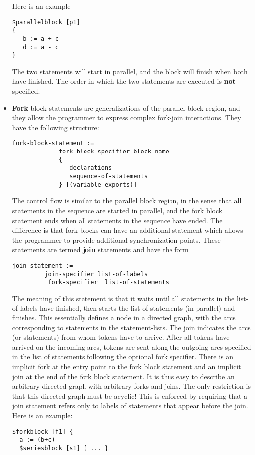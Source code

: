 \documentclass{article}
\begin{document}
\begin{itemize}
Here is an example
\begin{verbatim}
$parallelblock [p1] 
{
   b := a + c
   d := a - c
}
\end{verbatim} %
The two statements will start in parallel, and the block 
will finish when both have finished.  The
order in which the two statements are executed
is {\bf not} specified.
\item {\bf Fork} block statements are generalizations of the
parallel block region, and they allow the programmer to express 
complex fork-join interactions.
They have the following structure:
\begin{verbatim}
fork-block-statement :=
             fork-block-specifier block-name
             {
                declarations
                sequence-of-statements
             } [(variable-exports)]
\end{verbatim}
The control flow is similar to the parallel block region,
in the sense that all statements in the sequence are started
in parallel, and the fork block statement ends when all statements
in the sequence have ended.  The difference is that
fork blocks can have an additional statement which
allows the programmer to provide additional synchronization
points.  These statements are termed {\bf join} statements
and have the form
\begin{verbatim}
join-statement :=
         join-specifier list-of-labels 
          fork-specifier  list-of-statements
\end{verbatim}
The meaning of this statement is that it waits until all statements
in the list-of-labels have finished, then starts the list-of-statements
(in parallel) and finishes.  This essentially defines a node in a directed graph,
with the arcs corresponding to statements in the statement-lists.  
The join indicates the arcs (or statements) 
from whom tokens have to arrive.  After all tokens have arrived
on the incoming arcs, tokens are sent along the outgoing arcs specified
in the list of statements following the optional fork specifier.  There is an implicit fork
at the entry point to the fork block statement and an implicit join at the
end of the fork block statement.  It is thus easy to describe
an arbitrary directed graph with arbitrary forks and joins.  The only
restriction is that this directed graph must be acyclic!  This is enforced
by requiring that a join statement refers only to labels of statements
that appear before the join.
Here is an example:
\begin{verbatim}
$forkblock [f1] {
  a := (b+c)
  $seriesblock [s1] { ... }

\end{verbatim}
\end{itemize}
\end{document}
